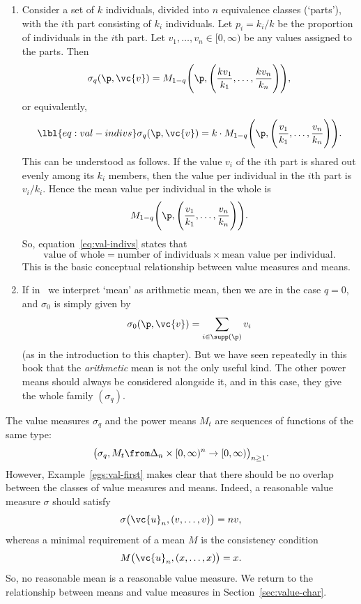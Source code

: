 \begin{examples}
\begin{enumerate}
\item 
{} 
Consider a set of $k$ individuals, divided into $n$ equivalence classes
(`parts'), with the $i$th part consisting of $k_i$ individuals.  Let $p_i =
k_i/k$ be the proportion of individuals in the $i$th part.  Let $v_1,
\ldots, v_n \in [0, \infty)$ be any values assigned to the parts.  Then
\[
\sigma_q(\p, \vc{v})
=
M_{1 - q}\Biggl( 
\p, \Biggl( \frac{kv_1}{k_1}, \ldots, \frac{kv_n}{k_n} \Biggr)
\Biggr),
\]
or equivalently,
% 
\begin{equation}
\lbl{eq:val-indivs}
\sigma_q(\p, \vc{v})
=
k \cdot 
M_{1 - q}\Biggl( 
\p, \Biggl( \frac{v_1}{k_1}, \ldots, \frac{v_n}{k_n} \Biggr)
\Biggr).
\end{equation}
% 
This can be understood as follows.  If the value $v_i$ of the $i$th part is
shared out evenly among its $k_i$ members, then the value%
%
% 
per individual in the $i$th part is $v_i/k_i$.  Hence the mean value per
individual in the whole is
\[
M_{1 - q}\Biggl(
\p, \Biggl( \frac{v_1}{k_1}, \ldots, \frac{v_n}{k_n} \Biggr)
\Biggr).
\]
So, equation~\eqref{eq:val-indivs} states that
% 
\[
\text{value of whole} = \text{number of individuals}
\times \text{mean value per individual}.
\]
% 
This is the basic conceptual relationship between value measures and
means. 

\item
If in~ we interpret `mean' as arithmetic mean,
then we are in the case $q = 0$, and $\sigma_0$ is simply given by
\[
\sigma_0(\p, \vc{v}) = \sum_{i \in \supp(\p)} v_i
\]
(as in the introduction to this chapter).  But we have seen repeatedly in
this book that the \emph{arithmetic} mean is not the only useful kind.  The
other power means should always be considered alongside it, and in this
case, they give the whole family $(\sigma_q)$. 
\end{enumerate}
\end{examples}

\begin{remark}
The value measures $\sigma_q$ and the power means $M_t$ are sequences of
functions of the same type:
\[
\bigl( 
\sigma_q, M_t \from \Delta_n \times [0, \infty)^n \to [0, \infty)
\bigr)_{n \geq 1}.
\]
However, Example~\ref{egs:val-first} makes clear
that there should be no overlap%
%
%
% 
between the classes of value measures and means.  Indeed, a reasonable
value measure $\sigma$ should satisfy
\[
\sigma\bigl( \vc{u}_n, (v, \ldots, v)\bigr) = nv,
\]
whereas a minimal requirement of a mean $M$ is the consistency condition
\[
M\bigl( \vc{u}_n, (x, \ldots, x)\bigr) = x.
\]
So, no reasonable mean is a reasonable value measure.  We return to the
relationship between means and value measures in
Section~\ref{sec:value-char}.
\end{remark}

